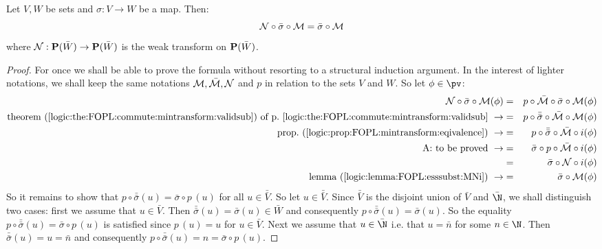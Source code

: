 \begin{lemma}\label{logic:lemma:FOPL:esssubst:NsM}
Let $V,W$ be sets and $\sigma:V\to W$ be a map. Then:
    \[
    {\cal N}\circ\bar{\sigma}\circ{\cal M}=\bar{\sigma}\circ{\cal M}
    \]
where ${\cal N}:{\bf P}(\bar{W})\to{\bf P}(\bar{W})$ is the weak
transform on ${\bf P}(\bar{W})$.
\end{lemma}
\begin{proof}
For once we shall be able to prove the formula without resorting to
a structural induction argument. In the interest of lighter
notations, we shall keep the same notations ${\cal M},\bar{\cal M},
{\cal N}$ and $p$ in relation to the sets $V$ and $W$. So let
$\phi\in\pv$:
    \begin{eqnarray*}
    {\cal N}\circ\bar{\sigma}\circ{\cal M}(\phi)&=&p\circ\bar{\cal
    M}\circ\bar{\sigma}\circ{\cal M}(\phi)\\
    \mbox{theorem~(\ref{logic:the:FOPL:commute:mintransform:validsub})
    of p.~\pageref{logic:the:FOPL:commute:mintransform:validsub}}\ \rightarrow
    &=&p\circ\bar{\bar{\sigma}}\circ\bar{\cal
    M}\circ{\cal M}(\phi)\\
    \mbox{prop.~(\ref{logic:prop:FOPL:mintransform:eqivalence})}\ \rightarrow
    &=&p\circ\bar{\bar{\sigma}}\circ\bar{\cal
    M}\circ i(\phi)\\
    \mbox{A: to be proved}\ \rightarrow&=&\bar{\sigma}\circ p\circ\bar{\cal
    M}\circ i(\phi)\\
    &=&\bar{\sigma}\circ{\cal
    N}\circ i(\phi)\\
    \mbox{lemma~(\ref{logic:lemma:FOPL:esssubst:MNi})}\ \rightarrow
    &=&\bar{\sigma}\circ{\cal
    M}(\phi)\\
    \end{eqnarray*}
So it remains to show that
$p\circ\bar{\bar{\sigma}}(u)=\bar{\sigma}\circ p\,(u)$ for all
$u\in\bar{\bar{V}}$. So let $u\in\bar{\bar{V}}$. Since
$\bar{\bar{V}}$ is the disjoint union of $\bar{V}$ and $\bar{\N}$,
we shall distinguish two cases: first we assume that $u\in\bar{V}$.
Then $\bar{\bar{\sigma}}(u)=\bar{\sigma}(u)\in\bar{W}$ and
consequently $p\circ\bar{\bar{\sigma}}(u)=\bar{\sigma}(u)$. So the
equality $p\circ\bar{\bar{\sigma}}(u)=\bar{\sigma}\circ p\,(u)$ is
satisfied since $p\,(u)=u$ for $u\in\bar{V}$. Next we assume that
$u\in\bar{\N}$ i.e. that $u=\bar{n}$ for some $n\in\N$. Then
$\bar{\bar{\sigma}}(u)=u=\bar{n}$ and consequently
$p\circ\bar{\bar{\sigma}}(u)=n=\bar{\sigma}\circ p\,(u)$.
\end{proof}

